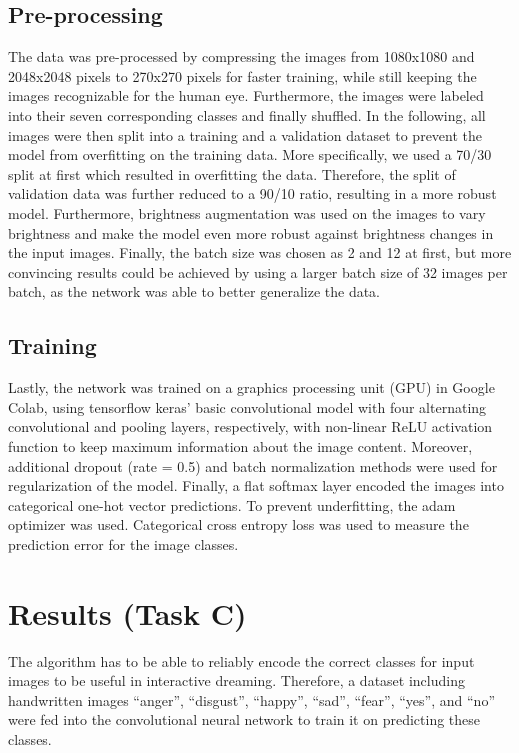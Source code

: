 \documentclass{article}
\begin{document}
\subsection*{Pre-processing}
The data was pre-processed by compressing the images from 1080x1080 and 2048x2048 pixels to 270x270 pixels for faster training, while still keeping the images recognizable for the human eye. Furthermore, the images were labeled into their seven corresponding classes and finally shuffled. In the following, all images were then split into a training and a validation dataset to prevent the model from overfitting on the training data. More specifically, we used a 70/30 split at first which resulted in overfitting the data. Therefore, the split of validation data was further reduced to a 90/10 ratio, resulting in a more robust model. Furthermore, brightness augmentation was used on the images to vary brightness and make the model even more robust against brightness changes in the input images. Finally, the batch size was chosen as 2 and 12 at first, but more convincing results could be achieved by using a larger batch size of 32 images per batch, as the network was able to better generalize the data.

\subsection*{Training}
Lastly, the network was trained on a graphics processing unit (GPU) in Google Colab, using tensorflow keras’ basic convolutional model with four alternating convolutional and pooling layers, respectively, with non-linear ReLU activation function to keep maximum information about the image content. Moreover, additional dropout (rate = 0.5) and batch normalization methods were used for regularization of the model. Finally, a flat softmax layer encoded the images into categorical one-hot vector predictions. To prevent underfitting, the adam optimizer \citep{kingma2014adam} was used. Categorical cross entropy loss was used to measure the prediction error for the image classes.



\section{Results (Task C)}

The algorithm has to be able to reliably encode the correct classes for input images to be useful in interactive dreaming. Therefore, a dataset including handwritten images “anger”, “disgust”, “happy”, “sad”, “fear”, “yes”, and “no” were fed into the convolutional neural network to train it on predicting these classes.
\\
\end{document}

